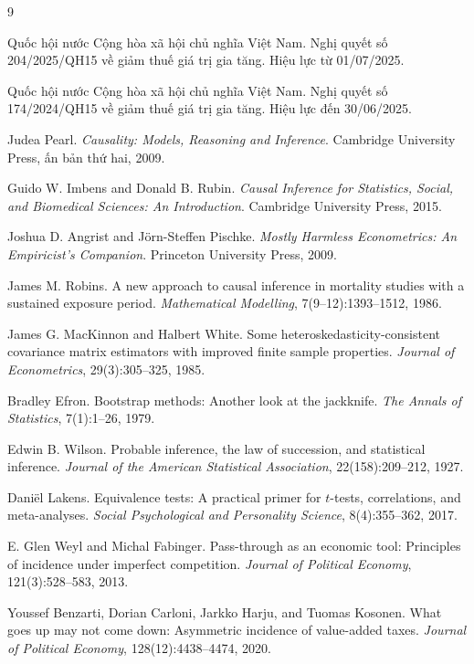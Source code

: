 \documentclass[11pt]{article}
\begin{document}
\begin{thebibliography}{9}

Quốc hội nước Cộng hòa xã hội chủ nghĩa Việt Nam.
\newblock Nghị quyết số 204/2025/QH15 về giảm thuế giá trị gia tăng.
\newblock Hiệu lực từ 01/07/2025.

Quốc hội nước Cộng hòa xã hội chủ nghĩa Việt Nam.
\newblock Nghị quyết số 174/2024/QH15 về giảm thuế giá trị gia tăng.
\newblock Hiệu lực đến 30/06/2025.

Judea Pearl.
\newblock \textit{Causality: Models, Reasoning and Inference}.
\newblock Cambridge University Press, ấn bản thứ hai, 2009.

Guido W. Imbens and Donald B. Rubin.
\newblock \textit{Causal Inference for Statistics, Social, and Biomedical Sciences: An
Introduction}.
\newblock Cambridge University Press, 2015.

Joshua D. Angrist and Jörn-Steffen Pischke.
\newblock \textit{Mostly Harmless Econometrics: An Empiricist's Companion}.
\newblock Princeton University Press, 2009.

James M. Robins.
\newblock A new approach to causal inference in mortality studies with a sustained exposure period.
\newblock \textit{Mathematical Modelling}, 7(9--12):1393--1512, 1986.

James G. MacKinnon and Halbert White.
\newblock Some heteroskedasticity-consistent covariance matrix estimators with improved finite
sample properties.
\newblock \textit{Journal of Econometrics}, 29(3):305--325, 1985.

Bradley Efron.
\newblock Bootstrap methods: Another look at the jackknife.
\newblock \textit{The Annals of Statistics}, 7(1):1--26, 1979.

Edwin B. Wilson.
\newblock Probable inference, the law of succession, and statistical inference.
\newblock \textit{Journal of the American Statistical Association}, 22(158):209--212, 1927.

Daniël Lakens.
\newblock Equivalence tests: A practical primer for $t$-tests, correlations, and meta-analyses.
\newblock \textit{Social Psychological and Personality Science}, 8(4):355--362, 2017.

E. Glen Weyl and Michal Fabinger.
\newblock Pass-through as an economic tool: Principles of incidence under imperfect competition.
\newblock \textit{Journal of Political Economy}, 121(3):528--583, 2013.

Youssef Benzarti, Dorian Carloni, Jarkko Harju, and Tuomas Kosonen.
\newblock What goes up may not come down: Asymmetric incidence of value-added taxes.
\newblock \textit{Journal of Political Economy}, 128(12):4438--4474, 2020.

\end{thebibliography}
\end{document}
